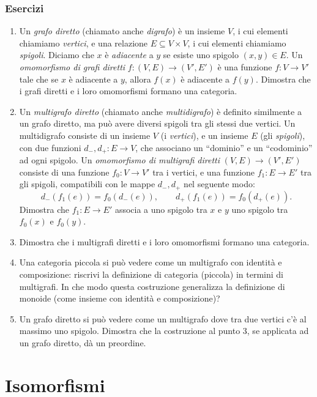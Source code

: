 \subsubsection*{Esercizi}
\begin{enumerate}
    \item Un \emph{grafo diretto} (chiamato anche \emph{digrafo}) è un insieme $V$, i cui elementi chiamiamo \emph{vertici}, e una relazione $E\subseteq V\times V$, i cui elementi chiamiamo \emph{spigoli}. Diciamo che $x$ è \emph{adiacente} a $y$ se esiste uno spigolo $(x,y)\in E$. Un \emph{omomorfismo di grafi diretti} $f:(V,E)\to (V',E')$ è una funzione $f:V\to V'$ tale che se $x$ è adiacente a $y$, allora $f(x)$ è adiacente a $f(y)$. Dimostra che i grafi diretti e i loro omomorfismi formano una categoria.
    \item Un \emph{multigrafo diretto} (chiamato anche \emph{multidigrafo}) è definito similmente a un grafo diretto, ma può avere diversi spigoli tra gli stessi due vertici. Un multidigrafo consiste di un insieme $V$ (i \emph{vertici}), e un insieme $E$ (gli \emph{spigoli}), con due funzioni $d_-,d_+:E\to V$, che associano un ``dominio'' e un ``codominio'' ad ogni spigolo. Un \emph{omomorfismo di multigrafi diretti} $(V,E)\to (V',E')$ consiste di una funzione $f_0:V\to V'$ tra i vertici, e una funzione $f_1:E\to E'$ tra gli spigoli, compatibili con le mappe $d_-,d_+$ nel seguente modo:
    \[
    d_-(f_1(e)) = f_0(d_-(e)) ,\qquad d_+(f_1(e)) = f_0(d_+(e)) .
    \]
    Dimostra che $f_1:E\to E'$ associa a uno spigolo tra $x$ e $y$ uno spigolo tra $f_0(x)$ e $f_0(y)$.
    \item Dimostra che i multigrafi diretti e i loro omomorfismi formano una categoria.
    \item Una categoria piccola si può vedere come un multigrafo con identità e composizione: riscrivi la definizione di categoria (piccola) in termini di multigrafi.  In che modo questa costruzione generalizza la definizione di monoide (come insieme con identità e composizione)?
    \item Un grafo diretto si può vedere come un multigrafo dove tra due vertici c'è al massimo uno spigolo. Dimostra che la costruzione al punto 3, se applicata ad un grafo diretto, dà un preordine.
\end{enumerate}
\color{black}
\cippo
\section{Isomorfismi}\label{isomorfismi}

